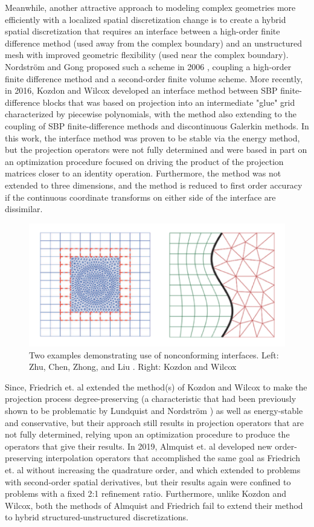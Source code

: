 Meanwhile, another attractive approach to modeling complex geometries more efficiently
with a localized spatial discretization change is to create a hybrid spatial
discretization that requires an interface between a high-order finite difference
method (used away from the complex boundary) and an unstructured mesh with
improved geometric flexibility (used near the complex boundary). Nordstr{\"o}m and Gong
proposed such a scheme in 2006 \cite{nordstrom2006stable}, coupling a high-order finite difference method
and a second-order finite volume scheme. More recently, in 2016, Kozdon and Wilcox
\cite{kozdon2016stable} developed an interface method between SBP finite-difference
blocks that was based on projection into an intermediate "glue" grid characterized by
piecewise polynomials, with the method also extending to the coupling of SBP
finite-difference methods and discontinuous Galerkin methods. In this work, the
interface method was proven to be stable via the energy method, but the projection operators were
not fully determined and were based in part on an optimization procedure focused on
driving the product of the projection matrices closer to an identity operation.
Furthermore, the method was not extended to three dimensions, and the method is reduced
to first order accuracy if the continuous coordinate transforms on either side of the
interface are dissimilar.
\begin{figure}
\centering
\includegraphics[width=0.8\linewidth,trim=4 4 4 4,clip]{figures/nonconforming_samples.png}
\caption{Two examples demonstrating use of nonconforming interfaces. Left: Zhu, Chen, Zhong, and Liu \cite{zhu2011hybrid}.
	 Right: Kozdon and Wilcox \cite{kozdon2016stable}}
\label{fig:nonconforming_samples}
\end{figure}
Since, Friedrich et. al \cite{friedrich2018conservative} extended the
method(s) of Kozdon and Wilcox to make the
projection process degree-preserving (a characteristic that had been
previously shown to be problematic by Lundquist and Nordstr{\"o}m \cite{lundquist2016suboptimal}) as well as
energy-stable and conservative, but their approach still results in projection
operators that are not fully determined, relying upon an optimization procedure
to produce the operators that give their results. In 2019, Almquist et. al
\cite{almquist2019order} developed new order-preserving interpolation operators that accomplished
the same goal as Friedrich et. al without increasing the quadrature order, and which
extended to problems with second-order spatial derivatives, but their results again
were confined to problems with a fixed 2:1 refinement ratio. Furthermore, unlike Kozdon
and Wilcox, both the methods of Almquist and Friedrich fail to extend their method
to hybrid structured-unstructured discretizations.

